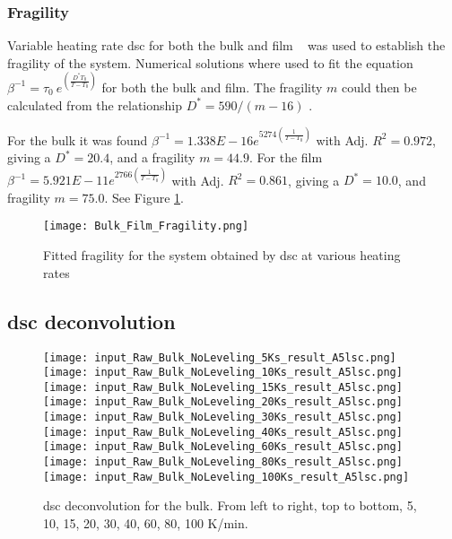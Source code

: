 \documentclass[a4paper,12pt,oneside]{article}%
\begin{document}
\subsubsection{Fragility}

Variable heating rate \acrshort{dsc} for both the bulk and film \MgZnCa~ was used to establish the fragility of the system. Numerical solutions where used to fit the equation $\beta^{-1} = \tau_{0}~ e^{(\frac{D^{*}T_{0}}{T-T_{0}})}$ \cite{Busch1998} for both the bulk and film. The fragility $m$ could then be calculated from the relationship $D^{*}=590/(m-16)$ \cite{Angell2002, Wei2014}.

For the bulk it was found $\beta^{-1} = 1.338E - 16e^{5274 (\frac{1}{T-T_{0}})}$ with Adj. $R^{2}=0.972$, giving a $D^{*}=20.4$, and a fragility $m=44.9$. For the film $\beta^{-1} = 5.921E - 11e^{2766 (\frac{1}{T-T_{0}})}$ with Adj. $R^{2}=0.861$, giving a $D^{*}=10.0$, and fragility $m=75.0$. See Figure \ref{fig:Fragility_BulkFilm_mValue}.

\begin{figure}[b]
	\centering
	\texttt{[image: Bulk\_Film\_Fragility.png]}
	\caption[Table of contents Capition]{Fitted fragility for the \MgZnCa system obtained by \acrshort{dsc} at various heating rates}
	\label{fig:Fragility_BulkFilm_mValue}
\end{figure}

\subsection{\acrshort{dsc} deconvolution}

\begin{figure}[b]
	\centering
	\texttt{[image: input\_Raw\_Bulk\_NoLeveling\_5Ks\_result\_A5lsc.png]}\quad
	\texttt{[image: input\_Raw\_Bulk\_NoLeveling\_10Ks\_result\_A5lsc.png]}\quad
	\texttt{[image: input\_Raw\_Bulk\_NoLeveling\_15Ks\_result\_A5lsc.png]}
	\medskip
	\texttt{[image: input\_Raw\_Bulk\_NoLeveling\_20Ks\_result\_A5lsc.png]}\quad
	\texttt{[image: input\_Raw\_Bulk\_NoLeveling\_30Ks\_result\_A5lsc.png]}\quad
	\texttt{[image: input\_Raw\_Bulk\_NoLeveling\_40Ks\_result\_A5lsc.png]}
	\medskip
	\texttt{[image: input\_Raw\_Bulk\_NoLeveling\_60Ks\_result\_A5lsc.png]}\quad
	\texttt{[image: input\_Raw\_Bulk\_NoLeveling\_80Ks\_result\_A5lsc.png]}\quad
	\texttt{[image: input\_Raw\_Bulk\_NoLeveling\_100Ks\_result\_A5lsc.png]}
	\caption{\acrshort{dsc} deconvolution for the bulk. From left to right, top to bottom, 5, 10, 15, 20, 30, 40, 60, 80, 100 K/min.}
	\label{fig:DSC_Bulk_Decon}
\end{figure}
\end{document}
